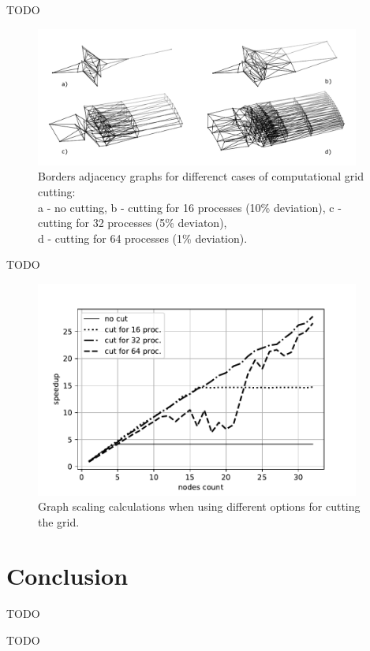 \documentclass[
11pt,%
tightenlines,%
twoside,%
onecolumn,%
nofloats,%
nobibnotes,%
nofootinbib,%
superscriptaddress,%
noshowpacs,%
centertags]%
{revtex4}
\begin{document}
TODO

\begin{figure}[h]
\setcaptionmargin{5mm}
\onelinecaptionsfalse
\includegraphics[width=0.95\textwidth]{pics/g_36.pdf}
\caption{Borders adjacency graphs for differenct cases of computational grid cutting: \\ a - no cutting, b - cutting for 16 processes (10\% deviation), c - cutting for 32 processes (5\% deviaton), \\ d - cutting for 64 processes (1\% deviation).}
\label{fig:g_36}
\end{figure}

TODO

\begin{figure}[h]
\setcaptionmargin{5mm}
\onelinecaptionstrue
\includegraphics[width=0.95\textwidth]{pics/plot_36_scaling.pdf}
\caption{Graph scaling calculations when using different options for cutting the grid.}
\label{fig:plot_36_scaling}
\end{figure}

\section{Conclusion}

TODO

\begin{acknowledgments}
TODO
\end{acknowledgments}

\begin{thebibliography}{99}


\end{thebibliography}
\end{document}
